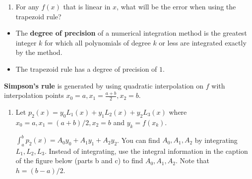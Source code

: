 \documentclass[12pt,letterpaper,noanswers]{exam}
\begin{document}



\begin{enumerate}[resume=classQ]
\item For any $f(x)$ that is linear in $x$, what will be the error when using the trapezoid rule?
\vspace{1cm}
\end{enumerate}

\begin{tcolorbox}
\begin{itemize}
\itemsep0pt
    \item The {\bf degree of precision} of a numerical integration method is the greatest integer $k$ for which all polynomials of degree $k$ or less are integrated exactly by the method.
\item The trapezoid rule has a degree of precision of $1$.
\end{itemize}

\end{tcolorbox}
\begin{tcolorbox}
\textbf{Simpson's rule} is generated by using quadratic interpolation on $f$ with interpolation points $x_0 = a, x_1 = \frac{a+b}{2}, x_2 = b$.
\end{tcolorbox}
\begin{enumerate}[resume=classQ]
    \item Let $p_2(x) = y_0L_1(x) + y_1L_2(x)+y_2L_3(x)$ where $x_0 = a, x_1 = (a+b)/2, x_2 = b$ and $y_k = f(x_k)$.  
    
    $\displaystyle\int_a^b p_2(x) = A_0 y_0 + A_1 y_1 + A_2 y_2$.  You can find $A_0, A_1, A_2$ by integrating $L_1, L_2, L_3$.  Instead of integrating, use the integral information in the caption of the figure below (parts b and c) to find $A_0, A_1, A_2$.  Note that $h = (b-a)/2$.
\end{enumerate}
\end{document}

